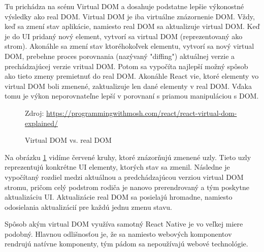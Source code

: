Tu prichádza na scénu Virtual DOM a dosahuje podstatne lepšie výkonostné výsledky ako real DOM. Virtual DOM je iba virtuálne znázornenie DOM. Vždy, keď sa zmení stav aplikácie, namiesto real DOM sa aktualizuje virtual DOM. Keď je do UI pridaný nový element, vytvorí sa virtual DOM (reprezentovaný ako strom). Akonáhle sa zmení stav ktoréhokoľvek elementu, vytvorí sa nový virtual DOM, prebehne proces porovnania (nazývaný "diffing") aktuálnej verzie a prechádzajúcej verzie vritual DOM. Potom sa vypočíta najlepší možný spôsob ako tieto zmeny premietnuť do real DOM. Akonáhle React vie, ktoré elementy vo virtual DOM boli zmenené, zaktualizuje len dané elementy v real DOM. Vďaka tomu je výkon neporovnateľne lepší v porovnaní s priamou manipuláciou s DOM.

\begin{figure}[!htbp]
  \centering  
  \def\stackalignment{c}
           {\scriptsize%
            Zdroj: \url{https://programmingwithmosh.com/react/react-virtual-dom-explained/}}
	\caption{Virtual DOM vs. real DOM}  
  \label{domImg}
\end{figure}
Na obrázku \ref{domImg} vidíme červené kruhy, ktoré znázorňujú zmenené uzly. Tieto uzly reprezentujú konkrétne UI elementy, ktorých stav sa zmenil. Následne je vypočítaný rozdiel medzi aktuálnou a predchádzajúcou verziou virtual DOM stromu, pričom celý podstrom rodiča je nanovo prerendrovaný a tým poskytne aktualizáciu UI. Aktualizácie real DOM sa posielajú hromadne, namiesto odosielania aktualizácií pre každú jednu zmenu stavu.

Spôsob akým virtual DOM využíva samotný React Native je vo veľkej miere podobný. Hlavnou odlišnosťou je, že sa namiesto webových komponentov rendrujú natívne komponenty, tým pádom sa nepoužívajú webové technológie.

